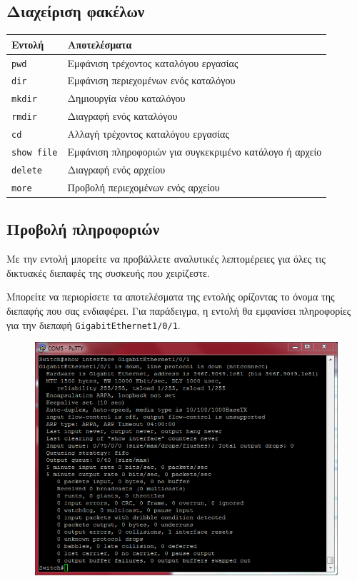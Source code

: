 \documentclass[12pt]{article}
\begin{document}
\subsection{Διαχείριση φακέλων}
\begin{center}
	\begin{tabular}{ll}
		\textbf{Εντολή} & \textbf{Αποτελέσματα} \\\hline
		 \texttt{pwd} & Εμφάνιση τρέχοντος καταλόγου εργασίας\\
		 \texttt{dir} & Εμφάνιση περιεχομένων ενός καταλόγου \\
		 \texttt{mkdir} & Δημιουργία νέου καταλόγου \\
		 \texttt{rmdir} & Διαγραφή ενός καταλόγου\\
		 \texttt{cd} & Αλλαγή τρέχοντος καταλόγου εργασίας\\
		 \texttt{show file} & Εμφάνιση πληροφοριών για συγκεκριμένο κατάλογο ή αρχείο\\
		 \texttt{delete} & Διαγραφή ενός αρχείου\\
		 \texttt{more} & Προβολή περιεχομένων ενός αρχείου
	\end{tabular}
\end{center}

\subsection{Προβολή πληροφοριών}
Με την εντολή  μπορείτε να προβάλλετε αναλυτικές λεπτομέρειες για όλες τις δικτυακές διεπαφές της συσκευής που χειρίζεστε.\\\par

Μπορείτε να περιορίσετε τα αποτελέσματα της εντολής ορίζοντας το όνομα της διεπαφής που σας ενδιαφέρει. Για παράδειγμα, η εντολή  θα εμφανίσει πληροφορίες για την διεπαφή \texttt{GigabitEthernet1/0/1}.
\begin{figure}[H]
	\centering
	\includegraphics[scale=.75]{show-spec-interface}
\end{figure}
\end{document}
